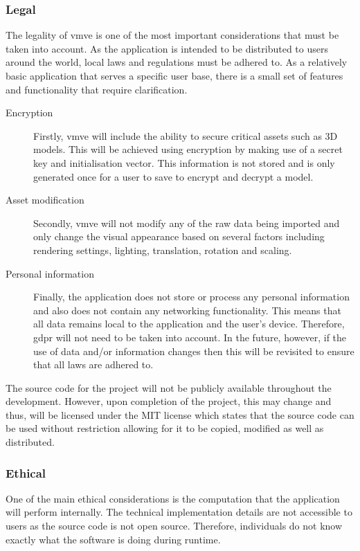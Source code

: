 \documentclass[11pt]{article}
\begin{document}
\subsubsection{Legal}
The legality of \gls*{vmve} is one of the most important considerations that
must be taken into account. As the application is intended to be distributed to
users around the world, local laws and regulations must be adhered to. As a
relatively basic application that serves a specific user base, there is a small
set of features and functionality that require clarification.

\begin{description}
  \item[Encryption]
    Firstly, \gls*{vmve} will include the ability to secure critical assets such
    as 3D models. This will be achieved using encryption by making use of a
    secret key and initialisation vector. This information is not stored and is
    only generated once for a user to save to encrypt and decrypt a model.

  \item[Asset modification] 
    Secondly, \gls*{vmve} will not modify any of the raw data being imported and
    only change the visual appearance based on several factors including
    rendering settings, lighting, translation, rotation and scaling. 

  \item[Personal information] 
    Finally, the application does not store or process any personal information
    and also does not contain any networking functionality. This means that all
    data remains local to the application and the user's device. Therefore,
    \gls*{gdpr} will not need to be taken into account. In the future, however,
    if the use of data and/or information changes then this will be revisited to
    ensure that all laws are adhered to. 
\end{description}

The source code for the project will not be publicly available throughout the
development. However, upon completion of the project, this may change and thus,
will be licensed under the MIT license \cite{mit} which states that the source
code can be used without restriction allowing for it to be copied, modified as
well as distributed.

\subsubsection{Ethical}
One of the main ethical considerations is the computation that the application
will perform internally. The technical implementation details are not accessible
to users as the source code is not open source. Therefore, individuals do not
know exactly what the software is doing during runtime.
\end{document}

